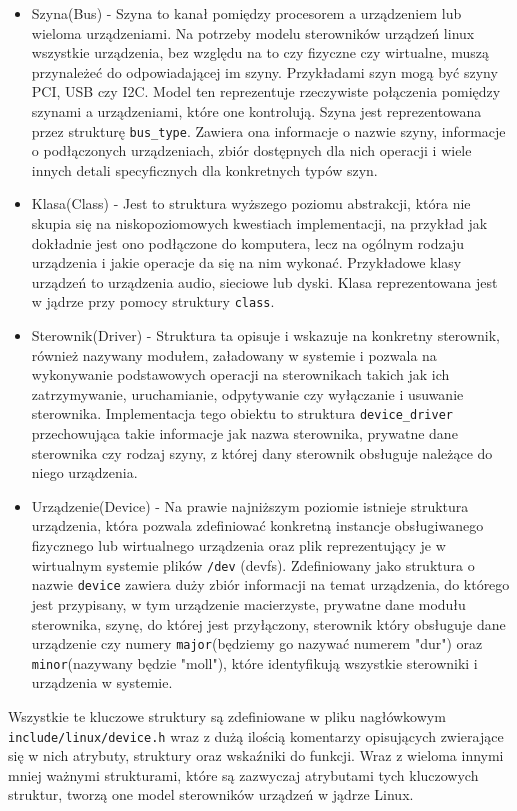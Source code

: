 \documentclass[10pt]{scrartcl}
\begin{document}
\begin{itemize}
\item
  Szyna(Bus) - Szyna to kanał pomiędzy procesorem a urządzeniem lub wieloma urządzeniami. Na potrzeby modelu sterowników urządzeń linux wszystkie urządzenia, bez względu na to czy fizyczne czy wirtualne, muszą przynależeć do odpowiadającej im szyny. Przykładami szyn mogą być szyny PCI, USB czy I2C. Model ten reprezentuje rzeczywiste połączenia pomiędzy szynami a urządzeniami, które one kontrolują. Szyna jest reprezentowana przez strukturę \texttt{bus\_type}. Zawiera ona informacje o nazwie szyny, informacje o podłączonych urządzeniach, zbiór dostępnych dla nich operacji i wiele innych detali specyficznych dla konkretnych typów szyn.
\item
  Klasa(Class) - Jest to struktura wyższego poziomu abstrakcji, która nie skupia się na niskopoziomowych kwestiach implementacji, na przykład jak dokładnie jest ono podłączone do komputera, lecz na ogólnym rodzaju urządzenia i jakie operacje da się na nim wykonać. Przykładowe klasy urządzeń to urządzenia audio, sieciowe lub dyski. Klasa reprezentowana jest w jądrze przy pomocy struktury \texttt{class}.
\item
  Sterownik(Driver) - Struktura ta opisuje i wskazuje na konkretny sterownik, również nazywany modułem, załadowany w systemie i pozwala na wykonywanie podstawowych operacji na sterownikach takich jak ich zatrzymywanie, uruchamianie, odpytywanie czy wyłączanie i usuwanie sterownika. Implementacja tego obiektu to struktura \texttt{device\_driver} przechowująca takie informacje jak nazwa sterownika, prywatne dane sterownika czy rodzaj szyny, z której dany sterownik obsługuje należące do niego urządzenia.
\item
  Urządzenie(Device) - Na prawie najniższym poziomie istnieje struktura urządzenia, która pozwala zdefiniować konkretną instancje obsługiwanego fizycznego lub wirtualnego urządzenia oraz plik reprezentujący je w wirtualnym systemie plików \texttt{/dev} (devfs).  Zdefiniowany jako struktura o nazwie \texttt{device} zawiera duży zbiór informacji na temat urządzenia, do którego jest przypisany, w tym urządzenie macierzyste, prywatne dane modułu sterownika, szynę, do której jest przyłączony, sterownik który obsługuje dane urządzenie czy numery \texttt{major}(będziemy go nazywać numerem "dur") oraz \texttt{minor}(nazywany będzie "moll"), które identyfikują wszystkie sterowniki i urządzenia w systemie.
\end{itemize}

Wszystkie te kluczowe struktury są zdefiniowane w pliku nagłówkowym \newline\texttt{include/linux/device.h} wraz z dużą ilością komentarzy opisujących zwierające się w nich atrybuty, struktury oraz wskaźniki do funkcji. Wraz z wieloma innymi mniej ważnymi strukturami, które są zazwyczaj atrybutami tych kluczowych struktur, tworzą one model sterowników urządzeń w jądrze Linux.
\end{document}
